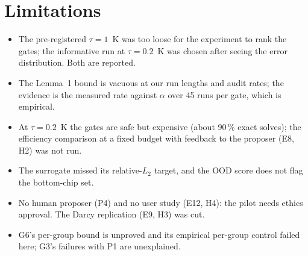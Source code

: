 \section{Limitations}
\begin{itemize}
\item The pre-registered $\tau = 1$~K was too loose for the experiment to rank the gates; the
informative run at $\tau = 0.2$~K was chosen after seeing the error distribution. Both are
reported.
\item The Lemma~1 bound is vacuous at our run lengths and audit rates; the evidence is the measured
rate against $\alpha$ over 45 runs per gate, which is empirical.
\item At $\tau = 0.2$~K the gates are safe but expensive (about 90\,\% exact solves); the
efficiency comparison at a fixed budget with feedback to the proposer (E8, H2) was not run.
\item The surrogate missed its relative-$L_2$ target, and the OOD score does not flag the
bottom-chip set.
\item No human proposer (P4) and no user study (E12, H4): the pilot needs ethics approval. The
Darcy replication (E9, H3) was cut.
\item G6's per-group bound is unproved and its empirical per-group control failed here; G3's
failures with P1 are unexplained.
\end{itemize}
